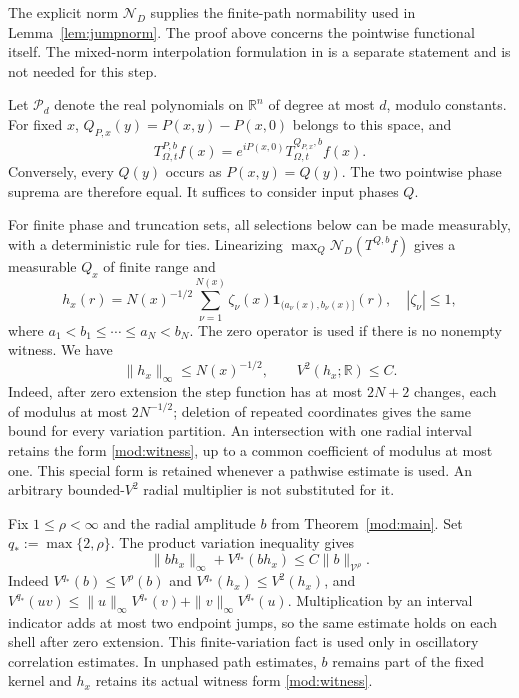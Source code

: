 \documentclass[11pt]{article}
\numberwithin{equation}{section}
\theoremstyle{remark}
\theoremstyle{definition}
\newcommand{\R}{\mathbb R}
\newcommand{\NN}{\mathcal N}
\newcommand{\PP}{\mathcal P}
\begin{document}
The explicit norm $\NN_D$ supplies the finite-path normability used
in Lemma~\ref{lem:jumpnorm}. The proof above concerns the pointwise
functional itself. The mixed-norm interpolation formulation in
\cite{MSZK} is a separate statement and is not needed for this step.

Let $\PP_d$ denote the real polynomials on $\R^n$ of degree at most $d$,
modulo constants. For fixed $x$,
$Q_{P,x}(y)=P(x,y)-P(x,0)$ belongs to this space, and
\[
 T^{P,b}_{\Omega,t}f(x)=e^{iP(x,0)}T^{Q_{P,x},b}_{\Omega,t}f(x).
\]
Conversely, every $Q(y)$ occurs as $P(x,y)=Q(y)$. The two pointwise phase
suprema are therefore equal. It suffices to consider input phases $Q$.

For finite phase and truncation sets, all selections below can be made
measurably, with a deterministic rule for ties. Linearizing
$\max_Q\NN_D(T^{Q,b}f)$ gives a measurable $Q_x$ of finite range and
\begin{equation}\label{mod:witness}
 h_x(r)=N(x)^{-1/2}\sum_{\nu=1}^{N(x)}
 \zeta_\nu(x)\mathbf1_{(a_\nu(x),b_\nu(x)]}(r),\quad |\zeta_\nu|\le1,
\end{equation}
where $a_1<b_1\le\cdots\le a_N<b_N$. The zero operator is used if there
is no nonempty witness. We have
\begin{equation}\label{mod:witnessbounds}
 \|h_x\|_\infty\le N(x)^{-1/2},\qquad V^2(h_x;\R)\le C.
\end{equation}
Indeed, after zero extension the step function has at most $2N+2$
changes, each of modulus at most $2N^{-1/2}$; deletion of repeated
coordinates gives the same bound for every variation partition.
An intersection with one radial interval retains the form
\eqref{mod:witness}, up to a common coefficient of modulus at most one.
This special form is retained whenever a pathwise estimate is used.
An arbitrary bounded-$V^2$ radial multiplier is not substituted for it.

Fix $1\le\rho<\infty$ and the radial amplitude $b$ from
Theorem~\ref{mod:main}. Set $q_*:=\max\{2,\rho\}$. The product
variation inequality gives
\begin{equation}\label{mod:weighted-profile}
 \|b h_x\|_\infty+V^{q_*}(b h_x)
 \le C\|b\|_{\mathcal V^\rho}.
\end{equation}
Indeed $V^{q_*}(b)\le V^\rho(b)$ and
$V^{q_*}(h_x)\le V^2(h_x)$, and
$V^{q_*}(uv)\le\|u\|_\infty V^{q_*}(v)+
\|v\|_\infty V^{q_*}(u)$. Multiplication by an interval indicator
adds at most two endpoint jumps, so the same estimate holds on each
shell after zero extension. This finite-variation fact is used only
in oscillatory correlation estimates. In unphased path estimates,
$b$ remains part of the fixed kernel and $h_x$ retains its actual
witness form \eqref{mod:witness}.
\end{document}
